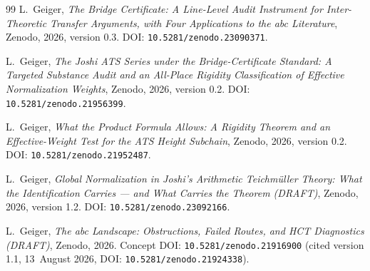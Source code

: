 \documentclass[11pt,a4paper]{article}
\begin{document}
\begin{thebibliography}{99}
L.~Geiger,
\emph{The Bridge Certificate: A Line-Level Audit Instrument for
Inter-Theoretic Transfer Arguments, with Four Applications to the abc Literature},
Zenodo, 2026, version 0.3.
DOI: \nolinkurl{10.5281/zenodo.23090371}.

L.~Geiger,
\emph{The Joshi ATS Series under the Bridge-Certificate Standard:
A Targeted Substance Audit and an All-Place Rigidity Classification
of Effective Normalization Weights},
Zenodo, 2026, version 0.2.
DOI: \nolinkurl{10.5281/zenodo.21956399}.

L.~Geiger,
\emph{What the Product Formula Allows: A Rigidity Theorem and an
Effective-Weight Test for the ATS Height Subchain},
Zenodo, 2026, version 0.2.
DOI: \nolinkurl{10.5281/zenodo.21952487}.

L.~Geiger,
\emph{Global Normalization in Joshi's Arithmetic Teichmüller Theory:
What the Identification Carries --- and What Carries the Theorem (DRAFT)},
Zenodo, 2026, version 1.2.
DOI: \nolinkurl{10.5281/zenodo.23092166}.

L.~Geiger,
\emph{The abc Landscape: Obstructions, Failed Routes, and HCT Diagnostics
(DRAFT)},
Zenodo, 2026.
Concept DOI: \nolinkurl{10.5281/zenodo.21916900}
(cited version 1.1, 13~August 2026, DOI: \nolinkurl{10.5281/zenodo.21924338}).

\end{thebibliography}
\end{document}
